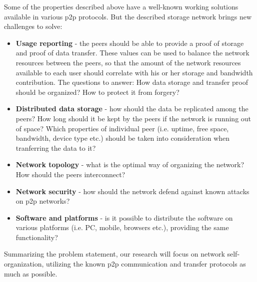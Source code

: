 Some of the properties described above have a well-known working solutions
available in various p2p protocols. But the described storage network brings
new challenges to solve:

\begin{itemize}
\item \textbf{Usage reporting} - the peers should be able to provide
  a proof of storage and proof of data transfer. These values can be used
  to balance the network resources between the peers, so that the amount
  of the network resources available to each user should correlate with
  his or her storage and bandwidth contribution. The questions to answer:
  How data storage and transfer proof should be organized? How to protect
  it from forgery?

\item \textbf{Distributed data storage} - how should the data be replicated
  among the peers? How long should it be kept by the peers if the network
  is running out of space? Which properties of individual peer (i.e. uptime,
  free space, bandwidth, device type etc.) should be  taken into consideration
  when tranferring the data to it?

\item \textbf{Network topology} - what is the optimal way of organizing the
  network? How should the peers interconnect?

\item \textbf{Network security} - how should the network defend against known
  attacks on p2p networks?

\item \textbf{Software and platforms} - is it possible to distribute the software
  on various platforms (i.e. PC, mobile, browsers etc.), providing the same
  functionality?
\end{itemize}

Summarizing the problem statement, our research will focus on network
self-organization, utilizing the known p2p communication and transfer protocols
as much as possible. 
